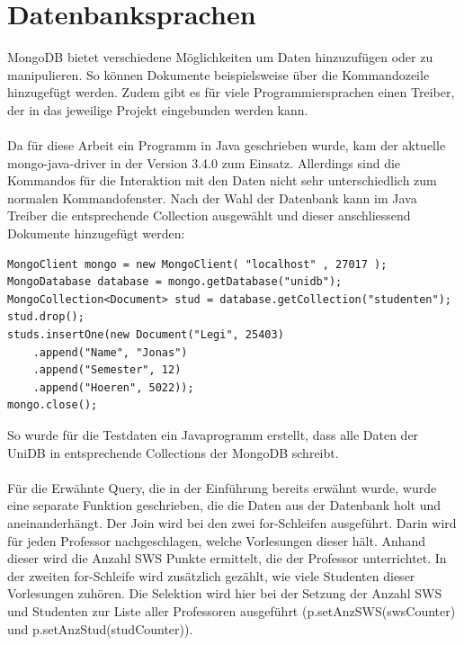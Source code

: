 \section{Datenbanksprachen}
\label{kap:Datenbanksprachen}
 
MongoDB bietet verschiedene Möglichkeiten um Daten hinzuzufügen oder zu manipulieren. So können Dokumente beispielsweise über die Kommandozeile hinzugefügt werden. Zudem gibt es für viele Programmiersprachen einen Treiber, der in das jeweilige Projekt eingebunden werden kann. 
 \\\\
Da für diese Arbeit ein Programm in Java geschrieben wurde, kam der aktuelle mongo-java-driver in der Version 3.4.0 zum Einsatz. Allerdings sind die Kommandos für die Interaktion mit den Daten nicht sehr unterschiedlich zum normalen Kommandofenster. Nach der Wahl der Datenbank kann im Java Treiber  die entsprechende Collection ausgewählt und dieser anschliessend Dokumente hinzugefügt werden:
 
\begin{lstlisting}[basicstyle=\scriptsize]
MongoClient mongo = new MongoClient( "localhost" , 27017 );
MongoDatabase database = mongo.getDatabase("unidb");
MongoCollection<Document> stud = database.getCollection("studenten");
stud.drop();
studs.insertOne(new Document("Legi", 25403)
	.append("Name", "Jonas")
	.append("Semester", 12)
	.append("Hoeren", 5022));
mongo.close();
\end{lstlisting}
\noindent
So wurde für die Testdaten ein Javaprogramm erstellt, dass alle Daten der UniDB in entsprechende Collections der MongoDB schreibt.
\\\\
Für die Erwähnte Query, die in der Einführung bereits erwähnt wurde, wurde eine separate Funktion geschrieben, die die Daten aus der Datenbank holt und aneinanderhängt. Der Join wird bei den zwei for-Schleifen ausgeführt. Darin wird für jeden Professor nachgeschlagen, welche Vorlesungen dieser hält. Anhand dieser wird die Anzahl SWS Punkte ermittelt, die der Professor unterrichtet. In der zweiten for-Schleife wird zusätzlich gezählt, wie viele Studenten dieser Vorlesungen zuhören. Die Selektion wird hier bei der Setzung der Anzahl SWS und Studenten zur Liste aller Professoren ausgeführt (p.setAnzSWS(swsCounter) und p.setAnzStud(studCounter)). 

